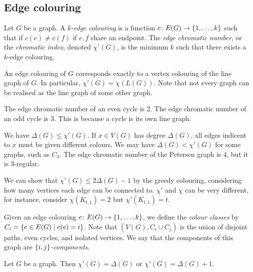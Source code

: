 \subsection{Edge colouring}
\begin{definition}
	Let \( G \) be a graph.
	A \emph{\( k \)-edge colouring} is a function \( c \colon E(G) \to \qty{1, \dots, k} \) such that if \( c(e) \neq c(f) \) if \( e, f \) share an endpoint.
	The \emph{edge chromatic number}, or the \emph{chromatic index}, denoted \( \chi'(G) \), is the minimum \( k \) such that there exists a \( k \)-edge colouring.
\end{definition}
\begin{remark}
	An edge colouring of \( G \) corresponds exactly to a vertex colouring of the line graph of \( G \).
	In particular, \( \chi'(G) = \chi(L(G)) \).
	Note that not every graph can be realised as the line graph of some other graph.
\end{remark}
\begin{example}
	The edge chromatic number of an even cycle is 2.
	The edge chromatic number of an odd cycle is 3.
	This is because a cycle is its own line graph.
\end{example}
\begin{example}
	We have \( \Delta(G) \leq \chi'(G) \).
	If \( x \in V(G) \) has degree \( \Delta(G) \), all edges indicent to \( x \) must be given different colours.
	We may have \( \Delta(G) < \chi'(G) \) for some graphs, such as \( C_3 \).
	The edge chromatic number of the Petersen graph is 4, but it is 3-regular.

	We can show that \( \chi'(G) \leq 2\Delta(G) - 1 \) by the greedy colouring, considering how many vertices each edge can be connected to.
	\( \chi' \) and \( \chi \) can be very different, for instance, consider \( \chi(K_{t,1}) = 2 \) but \( \chi'(K_{t,1}) = t \).
\end{example}
Given an edge colouring \( c \colon E(G) \to \qty{1, \dots, k} \), we define the \emph{colour classes} by \( C_i = \qty{e \in E(G) \mid c(e) = i} \).
Note that \( (V(G), C_i \cup C_j) \) is the union of disjoint paths, even cycles, and isolated vertices.
We say that the components of this graph are \emph{\( \qty{i,j} \)-components}.
\begin{theorem}[Vizing]
	Let \( G \) be a graph.
	Then \( \chi'(G) = \Delta(G) \) or \( \chi'(G) = \Delta(G) + 1 \).
\end{theorem}
